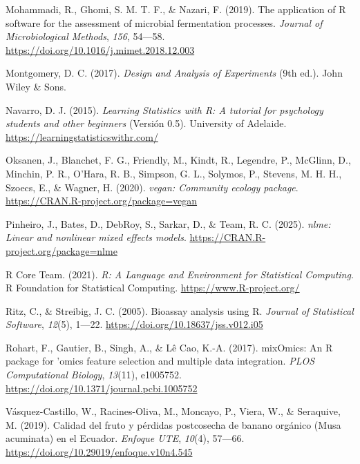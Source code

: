 \documentclass[
  spanish,
  letterpaper,
  DIV=11,
  numbers=noendperiod]{scrreprt}
\newlength{\cslhangindent}
\newenvironment{CSLReferences}[2] %
 {\begin{list}{}{%
  \setlength{\itemindent}{0pt}
  \setlength{\leftmargin}{0pt}
  \setlength{\parsep}{0pt}
  \ifodd #1
   \setlength{\leftmargin}{\cslhangindent}
   \setlength{\itemindent}{-1\cslhangindent}
  \fi
  \setlength{\itemsep}{#2\baselineskip}}}
 {\end{list}}
\begin{document}
\begin{CSLReferences}{1}{0}
Mohammadi, R., Ghomi, S. M. T. F., \& Nazari, F. (2019). {The
application of R software for the assessment of microbial fermentation
processes}. \emph{Journal of Microbiological Methods}, \emph{156},
54---58. \url{https://doi.org/10.1016/j.mimet.2018.12.003}

Montgomery, D. C. (2017). \emph{Design and Analysis of Experiments} (9th
ed.). John Wiley \& Sons.

Navarro, D. J. (2015). \emph{{Learning Statistics with R: A tutorial for
psychology students and other beginners}} (Versión 0.5). University of
Adelaide. \url{https://learningstatisticswithr.com/}

Oksanen, J., Blanchet, F. G., Friendly, M., Kindt, R., Legendre, P.,
McGlinn, D., Minchin, P. R., O'Hara, R. B., Simpson, G. L., Solymos, P.,
Stevens, M. H. H., Szoecs, E., \& Wagner, H. (2020). \emph{{vegan:
Community ecology package}}.
\url{https://CRAN.R-project.org/package=vegan}

Pinheiro, J., Bates, D., DebRoy, S., Sarkar, D., \& Team, R. C. (2025).
\emph{{nlme: Linear and nonlinear mixed effects models}}.
\url{https://CRAN.R-project.org/package=nlme}

R Core Team. (2021). \emph{R: A Language and Environment for Statistical
Computing}. R Foundation for Statistical Computing.
\url{https://www.R-project.org/}

Ritz, C., \& Streibig, J. C. (2005). {Bioassay analysis using R}.
\emph{Journal of Statistical Software}, \emph{12}(5), 1---22.
\url{https://doi.org/10.18637/jss.v012.i05}

Rohart, F., Gautier, B., Singh, A., \& Lê Cao, K.-A. (2017). {mixOmics:
An R package for 'omics feature selection and multiple data
integration}. \emph{PLOS Computational Biology}, \emph{13}(11),
e1005752. \url{https://doi.org/10.1371/journal.pcbi.1005752}

Vásquez-Castillo, W., Racines-Oliva, M., Moncayo, P., Viera, W., \&
Seraquive, M. (2019). Calidad del fruto y p{é}rdidas postcosecha de
banano org{á}nico ({Musa acuminata}) en el {Ecuador}. \emph{Enfoque
UTE}, \emph{10}(4), 57---66.
\url{https://doi.org/10.29019/enfoque.v10n4.545}


\end{CSLReferences}
\end{document}
